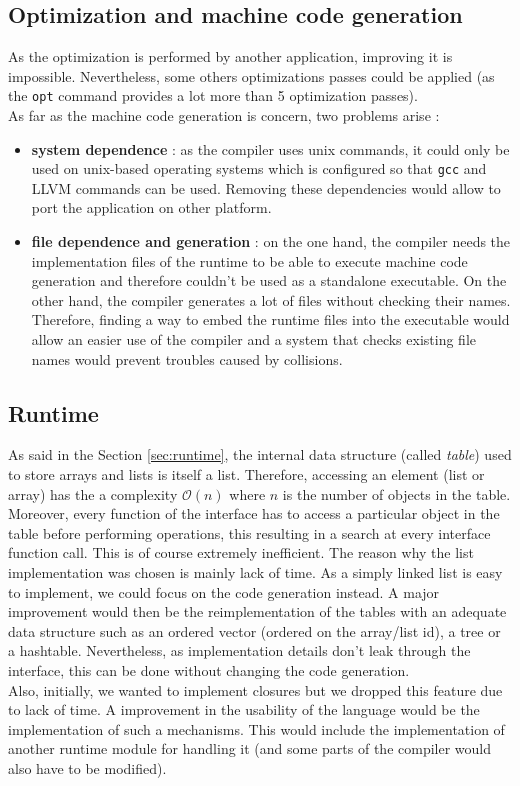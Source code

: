 \documentclass[a4paper,11pt]{article}
\begin{document}
\subsection{Optimization and machine code generation}
As the optimization is performed by another application, improving it is impossible. Nevertheless, some others optimizations passes could be applied (as the \texttt{opt} command provides a lot more than 5 optimization passes). \\
As far as the machine code generation is concern, two problems arise :
\begin{itemize}
	\item \textbf{system dependence} : as the compiler uses unix commands, it could only be used on unix-based operating systems which is configured so that \texttt{gcc} and LLVM commands can be used. Removing these dependencies would allow to port the application on other platform.
	\item \textbf{file dependence and generation} : on the one hand, the compiler needs the implementation files of the runtime to be able to execute machine code generation and therefore couldn't be used as a standalone executable. On the other hand, the compiler generates a lot of files without checking their names. Therefore, finding a way to embed the runtime files into the executable would allow an easier use of the compiler and a system that checks existing file names would prevent troubles caused by collisions.
\end{itemize}
\subsection{Runtime}
\label{ssec:flaws_runtime}
As said in the Section \ref{sec:runtime}, the internal data structure (called \textit{table}) used to store arrays and lists is itself a list. Therefore, accessing an element (list or array) has the a complexity $\mathcal{O}(n)$ where $n$ is the number of objects in the table. Moreover, every function of the interface has to access a particular object in the table before performing operations, this resulting in a search at every interface function call. This is of course extremely inefficient. The reason why the list implementation was chosen is mainly lack of time. As a simply linked list is easy to implement, we could focus on the code generation instead. A major improvement would then be the reimplementation of the tables with an adequate data structure such as an ordered vector (ordered on the array/list id), a tree or a hashtable. Nevertheless, as implementation details don't leak through the interface, this can be done without changing the code generation.
\\
Also, initially, we wanted to implement closures but we dropped this feature due to lack of time. A improvement in the usability of the language would be the implementation of such a mechanisms. This would include the implementation of another runtime module for handling it (and some parts of the compiler would also have to be modified).
\appendix
\end{document}
